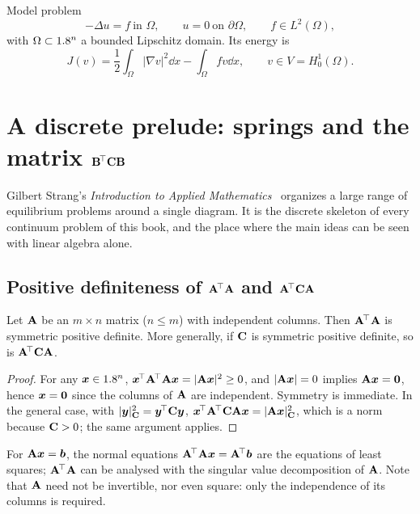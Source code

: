 \begin{gbox}{Model problem}
%
\begin{equation}\label{eq:poisson}
  -\Delta u = f \ \text{in } \Omega, \qquad u = 0 \ \text{on } \partial\Omega,
  \qquad f \in L^2(\Omega),
\end{equation}
with $\Omega\subset1.8^n$ a bounded Lipschitz domain. Its energy is
\begin{equation}\label{eq:poisson-energy}
  J(v) = \frac12\int_\Omega |\nabla v|^2\dd x - \int_\Omega f v\dd x,
  \qquad v\in V=H^1_0(\Omega).
\end{equation}
\end{gbox}

\section{A discrete prelude: springs and the matrix \texorpdfstring{$\mathbf{B}^{\!\top}\mathbf{C}\mathbf{B}$}{BtCB}}\label{sec:var-discrete}
Gilbert Strang's \emph{Introduction to Applied Mathematics}~\cite{Strang1986}
organizes a large range of equilibrium problems around a single diagram. It
is the discrete skeleton of every continuum problem of this book, and the
place where the main ideas can be seen with linear algebra alone.

\subsection{Positive definiteness of \texorpdfstring{$\mathbf{A}^{\!\top}\mathbf{A}$}{AtA} and \texorpdfstring{$\mathbf{A}^{\!\top}\mathbf{C}\mathbf{A}$}{AtCA}}
\begin{proposition}\label{prop:AtCA}
%
Let $\mathbf{A}$ be an $m\times n$ matrix ($n\le m$) with independent columns.
Then $\mathbf{A}^{\!\top}\mathbf{A}$ is symmetric positive definite. More generally, if
$\mathbf{C}$ is symmetric positive definite, so is $\mathbf{A}^{\!\top}\mathbf{C}\mathbf{A}$.
\end{proposition}
\begin{proof}
For any $\bm{x}\in1.8^n$, $\bm{x}^{\!\top}\mathbf{A}^{\!\top}\mathbf{A}\bm{x}=|\mathbf{A}\bm{x}|^2\ge0$, and
$|\mathbf{A}\bm{x}|=0$ implies $\mathbf{A}\bm{x}=\bm{0}$, hence $\bm{x}=\bm{0}$ since the
columns of $\mathbf{A}$ are independent. Symmetry is immediate. In the general
case, with $|\bm{y}|_{\mathbf{C}}^2=\bm{y}^{\!\top}\mathbf{C}\bm{y}$,
$\bm{x}^{\!\top}\mathbf{A}^{\!\top}\mathbf{C}\mathbf{A}\bm{x}=|\mathbf{A}\bm{x}|_{\mathbf{C}}^2$, which is a norm
because $\mathbf{C}>0$; the same argument applies.
\end{proof}
For $\mathbf{A}\bm{x}=\bm{b}$, the normal equations $\mathbf{A}^{\!\top}\mathbf{A}\bm{x}=\mathbf{A}^{\!\top}\bm{b}$
are the equations of least squares; $\mathbf{A}^{\!\top}\mathbf{A}$ can be analysed with
the singular value decomposition of $\mathbf{A}$. Note that $\mathbf{A}$ need not
be invertible, nor even square: only the independence of its columns is
required.

